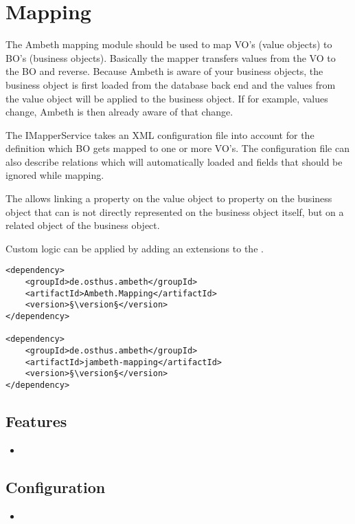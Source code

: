 \section{Mapping}
\label{module:Mapping}
\ClearAPI
\TODO The Ambeth mapping module should be used to map VO's (value objects) to BO's (business objects). Basically the mapper transfers values from the VO to the BO and reverse. Because Ambeth is aware of your business objects, the business object is first loaded from the database back end and the values from the value object will be applied to the business object. If for example, values change, Ambeth is then already aware of that change. 

The IMapperService takes an XML configuration file into account for the definition which BO gets mapped to one or more VO's. The configuration file can also describe relations which will automatically loaded and fields that should be ignored while mapping.

The  allows linking a property on the value object to property on the business object that can is not directly represented on the business object itself, but on a related object of the business object. 

Custom logic can be applied by adding an extensions to the .


\begin{lstlisting}[style=POM,caption={Maven modules to use \emph{Ambeth Mapping}}]
<dependency>
	<groupId>de.osthus.ambeth</groupId>
	<artifactId>Ambeth.Mapping</artifactId>
	<version>§\version§</version>
</dependency>

<dependency>
	<groupId>de.osthus.ambeth</groupId>
	<artifactId>jambeth-mapping</artifactId>
	<version>§\version§</version>
</dependency>
\end{lstlisting}
\subsection{Features}
\begin{itemize}
	\item \TODO
\end{itemize}

\subsection{Configuration}
\begin{itemize}
	\item {}
\end{itemize}
